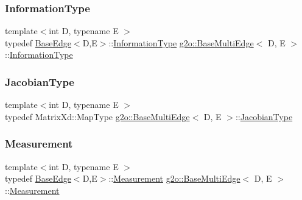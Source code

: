 \mbox{\label{classg2o_1_1_base_multi_edge_a368ab136a2cee049549cb479fb4c88fa}} 
\subsubsection{\texorpdfstring{Information\+Type}{InformationType}}
{\footnotesize\ttfamily template$<$int D, typename E $>$ \\
typedef \mbox{\hyperlink{classg2o_1_1_base_edge}{Base\+Edge}}$<$D,E$>$\+::\mbox{\hyperlink{classg2o_1_1_base_edge_a2e5a33343ac3f189d8a7d5ee4d8b73fc}{Information\+Type}} \mbox{\hyperlink{classg2o_1_1_base_multi_edge}{g2o\+::\+Base\+Multi\+Edge}}$<$ D, E $>$\+::\mbox{\hyperlink{classg2o_1_1_base_edge_a2e5a33343ac3f189d8a7d5ee4d8b73fc}{Information\+Type}}}

\mbox{\label{classg2o_1_1_base_multi_edge_a43dfdf5b27df296a32ee5a11f0653d55}} 
\subsubsection{\texorpdfstring{Jacobian\+Type}{JacobianType}}
{\footnotesize\ttfamily template$<$int D, typename E $>$ \\
typedef Matrix\+Xd\+::\+Map\+Type \mbox{\hyperlink{classg2o_1_1_base_multi_edge}{g2o\+::\+Base\+Multi\+Edge}}$<$ D, E $>$\+::\mbox{\hyperlink{classg2o_1_1_base_multi_edge_a43dfdf5b27df296a32ee5a11f0653d55}{Jacobian\+Type}}}

\mbox{\label{classg2o_1_1_base_multi_edge_acbaff4c018fb314db5c7852054ffb89d}} 
\subsubsection{\texorpdfstring{Measurement}{Measurement}}
{\footnotesize\ttfamily template$<$int D, typename E $>$ \\
typedef \mbox{\hyperlink{classg2o_1_1_base_edge}{Base\+Edge}}$<$D,E$>$\+::\mbox{\hyperlink{classg2o_1_1_base_edge_a2c148abba650a20b8c7eed75d3e2211e}{Measurement}} \mbox{\hyperlink{classg2o_1_1_base_multi_edge}{g2o\+::\+Base\+Multi\+Edge}}$<$ D, E $>$\+::\mbox{\hyperlink{classg2o_1_1_base_edge_a2c148abba650a20b8c7eed75d3e2211e}{Measurement}}}



